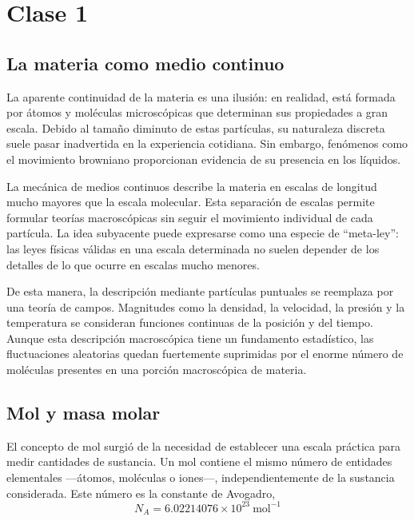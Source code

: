 \shorthandoff{<>}



\shorthandon{<>}

\chapter{Clase 1}

\section{La materia como medio continuo}

La aparente continuidad de la materia es una ilusión: en realidad, está
formada por átomos y moléculas microscópicas que determinan sus propiedades a
gran escala. Debido al tamaño diminuto de estas partículas, su naturaleza
discreta suele pasar inadvertida en la experiencia cotidiana. Sin embargo,
fenómenos como el movimiento browniano proporcionan evidencia de su presencia
en los líquidos.

La mecánica de medios continuos describe la materia en escalas de longitud
mucho mayores que la escala molecular. Esta separación de escalas permite
formular teorías macroscópicas sin seguir el movimiento individual de cada
partícula. La idea subyacente puede expresarse como una especie de
``meta-ley'': las leyes físicas válidas en una escala determinada no suelen
depender de los detalles de lo que ocurre en escalas mucho menores.

De esta manera, la descripción mediante partículas puntuales se reemplaza por
una teoría de campos. Magnitudes como la densidad, la velocidad, la presión y
la temperatura se consideran funciones continuas de la posición y del tiempo.
Aunque esta descripción macroscópica tiene un fundamento estadístico, las
fluctuaciones aleatorias quedan fuertemente suprimidas por el enorme número de
moléculas presentes en una porción macroscópica de materia.

\section{Mol y masa molar}

El concepto de mol surgió de la necesidad de establecer una escala práctica
para medir cantidades de sustancia. Un mol contiene el mismo número de
entidades elementales ---átomos, moléculas o iones---, independientemente de la
sustancia considerada. Este número es la constante de Avogadro,
$$ N_A = 6.02214076\times 10^{23}\ \mathrm{mol}^{-1} $$

